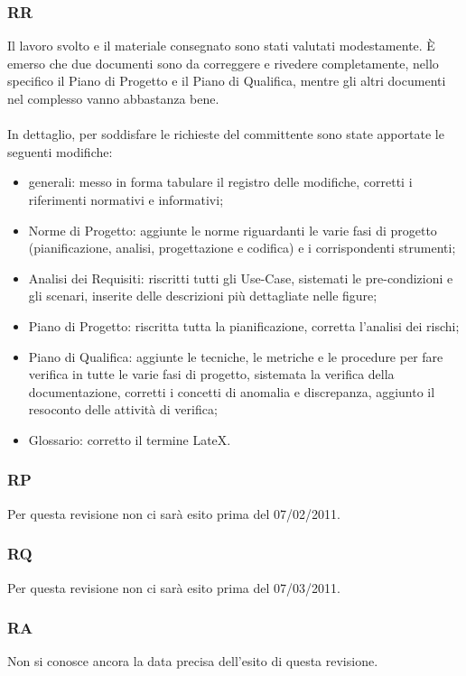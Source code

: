 \subsubsection{RR}
Il lavoro svolto e il materiale consegnato sono stati valutati modestamente. \`E
emerso che due documenti sono da correggere e rivedere completamente, nello
specifico il Piano di Progetto e il Piano di Qualifica, mentre gli altri documenti nel complesso
vanno abbastanza bene. \\ \\
In dettaglio, per soddisfare le richieste del committente sono state apportate
le seguenti modifiche:
\begin{itemize}
  \item generali: messo in forma tabulare il registro delle modifiche, corretti
  i riferimenti normativi e informativi;
  \item Norme di Progetto: aggiunte le norme riguardanti le varie fasi di
  progetto (pianificazione, analisi, progettazione e codifica) e i corrispondenti strumenti;
  \item Analisi dei Requisiti: riscritti tutti gli Use-Case, sistemati le
  pre-condizioni e gli scenari, inserite delle descrizioni pi\`u dettagliate
  nelle figure;
  \item Piano di Progetto: riscritta tutta la pianificazione, corretta l'analisi
  dei rischi;
  \item Piano di Qualifica: aggiunte le tecniche, le metriche e le procedure per
  fare verifica in tutte le varie fasi di progetto, sistemata la verifica della
  documentazione, corretti i concetti di anomalia e discrepanza, aggiunto
  il resoconto delle attivit\`a di verifica;
  \item Glossario: corretto il termine LateX.
\end{itemize}

\subsubsection{RP}
Per questa revisione non ci sar\`a esito prima del 07/02/2011.

\subsubsection{RQ}
Per questa revisione non ci sar\`a esito prima del 07/03/2011.

\subsubsection{RA}
Non si conosce ancora la data precisa dell'esito di questa revisione.

